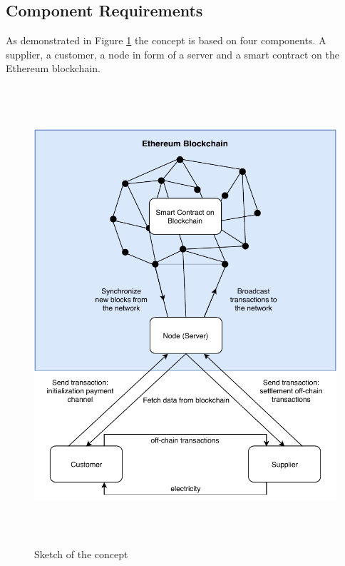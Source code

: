 \subsection{Component Requirements}
As demonstrated in Figure \ref{fig:concept} the concept is based on four components.
A supplier, a customer, a node in form of a server and a smart contract on the Ethereum blockchain.
\\
\begin{figure}[H]
  \begin{center}
    \includegraphics[height=17cm]{img/concept.pdf}
    \caption{Sketch of the concept}
    \label{fig:concept}
  \end{center}
\end{figure}

